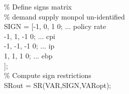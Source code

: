 \hspace{1mm}\hspace{5mm} \hspace{5mm} \hspace{5mm} \textcolor{matlabgreen}{\% Define signs matrix }\\ 
\hspace{1mm}\hspace{5mm} \hspace{5mm} \hspace{5mm} \textcolor{matlabgreen}{\%     demand    supply   monpol  un-identified }\\ 
\hspace{1mm}\hspace{5mm} \hspace{5mm} \hspace{5mm} SIGN = [-1,       0,       1      0;        ... policy rate \\ 
\hspace{1mm}\hspace{5mm} \hspace{5mm} \hspace{5mm} -1,       1,      -1      0;        ... cpi \\ 
\hspace{1mm}\hspace{5mm} \hspace{5mm} \hspace{5mm} -1,      -1,      -1      0;        ... ip \\ 
\hspace{1mm}\hspace{5mm} \hspace{5mm} \hspace{5mm} 1,       1,       1      0;        ... ebp \\ 
\hspace{1mm}\hspace{5mm} \hspace{5mm} \hspace{5mm} ]; \\ 
\hspace{1mm}\hspace{5mm} \hspace{5mm} \hspace{5mm} \textcolor{matlabgreen}{\% Compute sign restrictions }\\ 
\hspace{1mm}\hspace{5mm} \hspace{5mm} \hspace{5mm} SRout = SR(VAR,SIGN,VARopt); \\ 
